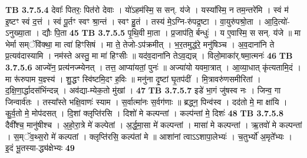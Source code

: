 \documentclass[17pt]{extarticle}
\begin{document}
{{{{{{{{{{{{{{{{{{{                  \newline
                                \textbf{ TB 3.7.5.4} \newline
                  देवाः᳚ पितरः॒ पित॑रो देवाः । यो॑ऽहम॑स्मि॒ स सन्. य॑जे । यस्या᳚स्मि॒ न तम॒न्तरे॑मि । स्वं म॑ इ॒ष्टꣳ स्वं द॒त्तं । स्वं पू॒र्तꣳ स्वꣳ श्रा॒न्तं । स्वꣳ हु॒तं । तस्य॑ मे॒ऽग्नि-रु॑पद्र॒ष्टा । वा॒युरु॑पश्रो॒ता । आ॒दि॒त्यो॑-ऽनुख्या॒ता । द्यौः पि॒ता \textbf{ 45} \newline
                  \newline
                                \textbf{ TB 3.7.5.5} \newline
                  पृ॒थि॒वी मा॒ता । प्र॒जाप॑ति॒ र्बन्धुः॑ । य ए॒वास्मि॒ स सन्. य॑जे ॥ मा भेर्मा सम्ॅवि॑क्था॒ मा त्वा॑ हिꣳसिषं । मा ते॒ तेजो-ऽप॑क्रमीत् । भ॒र॒तमुद्ध॑रे॒ मनु॑षिञ्च । अ॒व॒दाना॑नि ते प्र॒त्यव॑दास्यामि । नम॑स्ते अस्तु॒ मा मा॑ हिꣳसीः ॥ यद॑व॒दाना॑नि तेऽव॒द्यन्न् । विलो॒माका॑र्.षमा॒त्मनः॑ \textbf{ 46} \newline
                  \newline
                                \textbf{ TB 3.7.5.6} \newline
                  आज्ये॑न॒ प्रत्य॑नज्म्येनत् । तत्त॒ आप्या॑यतां॒ पुनः॑ ॥ अज्या॑यो यवमा॒त्रात् । आ॒व्या॒धात् कृ॑त्यतामि॒दं । मा रू॑रुपाम य॒ज्ञ्स्य॑ । शु॒द्धꣳ स्वि॑ष्टमि॒दꣳ ह॒विः ॥ मनु॑ना दृ॒ष्टां घृ॒तप॑दीं । मि॒त्रावरु॑णसमीरितां । द॒क्षि॒णा॒र्द्धादस॑भिंन्दन्न् । अव॑द्या-म्येक॒तो मु॑खां । \textbf{ 47} \newline
                  \newline
                                \textbf{ TB 3.7.5.7} \newline
                  इडे॑ भा॒गं जु॑षस्व नः । जिन्व॒ गा जिन्वार्व॑तः । तस्या᳚स्ते भक्षि॒वाणः॑ स्याम । स॒र्वात्मा॑नः स॒र्वग॑णाः ॥ ब्रद्ध्न॒ पिन्व॑स्व । दद॑तो मे॒ मा क्षा॑यि । कु॒र्व॒तो मे॒ मोप॑दसत् । दि॒शां क्लृप्ति॑रसि । दिशो॑ मे कल्पन्तां । कल्प॑न्तां मे॒ दिशः॑ \textbf{ 48} \newline
                  \newline
                                \textbf{ TB 3.7.5.8} \newline
                  दैवी᳚श्च॒ मानु॑षीश्च । अ॒हो॒रा॒त्रे मे॑ कल्पेतां । अ॒र्द्ध॒मा॒सा मे॑ कल्पन्तां । मासा॑ मे कल्पन्तां । ऋ॒तवो॑ मे कल्पन्तां । स॒म्ॅव॒थ्स॒रो मे॑ कल्पतां । क्लृप्ति॑रसि॒ कल्प॑तां मे ॥ आशा॑नां त्वाऽऽशापा॒लेभ्यः॑ । च॒तुर्भ्यो॑ अ॒मृते᳚भ्यः । इ॒दं भू॒तस्या-द्ध्य॑क्षेभ्यः \textbf{ 49} \newline
                  \newline
}}}}}}}}}}}}}}}}}}}
\end{document}
